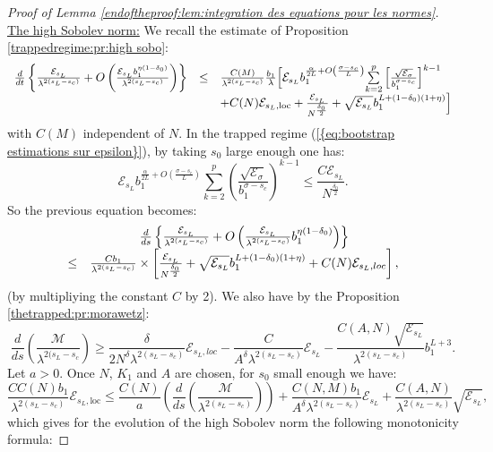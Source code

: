 \documentclass[11pt,a4paper,reqno]{amsart}
\theoremstyle{remark}
\numberwithin{equation}{section}
\begin{document}
\begin{proof}[ Proof of Lemma \ref{endoftheproof:lem:integration des equations pour les normes}]
\underline{The high Sobolev norm:} We recall the estimate of Proposition \ref{trappedregime:pr:high sobo}:
$$
\begin{array}{r c l}
\frac{d}{dt}\left\{ \frac{\mathcal{E}_{s_L}}{\lambda^{2(s_L-s_c)}}+O\left( \frac{\mathcal{E}_{s_L}b_1^{\eta(1-\delta_0)}}{\lambda^{2(s_L-s_c)}}\right) \right\}  &\leq& \frac{C(M)}{\lambda^{2(s_L-s_c)}}\frac{b_1}{\lambda}  \Bigl[ \mathcal{E}_{s_L}b_1^{\frac{\alpha}{2L}+O\left( \frac{\sigma-s_c}{L} \right)}\underset{k=2}{\overset{p}{\sum}} \left[\frac{\sqrt{\mathcal{E}_{\sigma}}}{b_1^{\sigma-s_c}} \right]^{k-1} \\
&&+C(N)\mathcal{E}_{s_L,\text{loc}}+\frac{\mathcal{E}_{s_L}}{N^{\frac{\delta_0}{2}}} + \sqrt{\mathcal{E}_{s_L}}b_1^{L+(1-\delta_0)(1+\eta)} \Bigr]
\end{array}
$$
with $C(M)$ independent of $N$. In the trapped regime {{\rm (\ref{{eq:bootstrap estimations sur epsilon}})}}, by taking $s_0$ large enough one has:
$$
\mathcal{E}_{s_L}b_1^{\frac{\alpha}{2L}+O\left(\frac{\sigma-s_c}{L}\right)} \underset{k=2}{\overset{p}{\sum}}\left(\frac{\sqrt{\mathcal{E}_{\sigma}}}{b_1^{\sigma-s_c}} \right)^{k-1}\leq \frac{C\mathcal{E}_{s_L}}{N^{\frac{\delta_0}{2}}}.
$$
So the previous equation becomes:
$$
\begin{array}{r c l}
&\frac{d}{ds}\left\{ \frac{\mathcal{E}_{s_L}}{\lambda^{2(s_L-s_c)}}+O\left( \frac{\mathcal{E}_{s_L}}{\lambda^{2(s_L-s_c)}}b_1^{\eta(1-\delta_0)}\right) \right\} \\ \leq& \frac{Cb_1}{\lambda^{2(s_L-s_c)}}
\times \left[ \frac{\mathcal{E}_{s_L}}{N^{\frac{\delta_0}{2}}} + \sqrt{\mathcal{E}_{s_L}}b_1^{L+(1-\delta_0)(1+\eta)}+C(N)\mathcal{E}_{s_L,loc}\right] , 
\end{array}
$$
(by multipliying the constant $C$ by 2). We also have by the Proposition \ref{thetrapped:pr:morawetz}:
$$
\frac{d}{ds} \left(\frac{\mathcal{M}}{\lambda^{2(s_L-s_c}}\right)\geq \frac{\delta}{2N^{\delta}\lambda^{2(s_L-s_c)}} \mathcal{E}_{s_L,loc}-\frac{C}{A^{\delta}\lambda^{2(s_L-s_c)}}\mathcal{E}_{s_L}-\frac{C(A,N)\sqrt{\mathcal{E}_{s_L}}}{\lambda^{2(s_L-s_c)}}b_1^{L+3} .
$$
Let $a>0$. Once $N$, $K_1$ and $A$ are chosen, for $s_0$ small enough we have:
$$
\frac{C C(N)b_1}{\lambda^{2(s_L-s_c)}}\mathcal{E}_{s_L,\text{loc}} \leq \frac{C(N)}{a}\left( \frac{d}{ds}\left( \frac{\mathcal{M}}{\lambda^{2(s_L-s_c)}} \right) \right)+\frac{C(N,M)b_1}{A^{\delta}\lambda^{2(s_L-s_c)}}\mathcal{E}_{s_L}+\frac{C(A,N)}{\lambda^{2(s_L-s_c)}}\sqrt{\mathcal{E}_{s_L}} ,
$$
which gives for the evolution of the high Sobolev norm the following monotonicity formula:

\end{proof}
\end{document}

